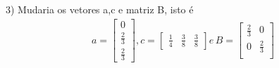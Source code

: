 \documentclass[a4paper,12pt]{article}
\begin{document}
3) Mudaria os vetores a,c e matriz B, isto \'e
{\arraycolsep=3.4pt\def\arraystretch{1.4}
\begin{align*}
	 a = \left [
		 \begin{array}{c}	
			 0 \\
			 \frac{2}{3} \\
			 \frac{2}{3} 
\end{array} \right 
], 
c =\left [
	\begin{array}{ccc} 
		\frac{1}{4} & \frac{3}{8} & \frac{3}{8}
\end{array}
\right ] 
e \hspace{2pt} 
B =\left [
	\begin{array}{cc} 
		 \frac{2}{3} & 0 \\ 
		0 & \frac{2}{3}\\ 
\end{array}
\right 
]
\end{align*}
}
\end{document}
